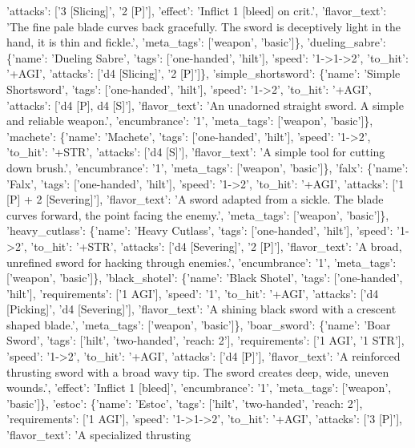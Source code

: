 \documentclass[
  letterpaper,
  DIV=11,
  numbers=noendperiod]{scrartcl}
\begin{document}
{'attacks': {[}'3 {[}Slicing{]}', '2 {[}P{]}'{]}, 'effect': 'Inflict 1
{[}bleed{]} on crit.', 'flavor\_text': 'The fine pale blade curves back
gracefully. The sword is deceptively light in the hand, it is thin and
fickle.', 'meta\_tags': {[}'weapon', 'basic'{]}\}, 'dueling\_sabre':
\{'name': 'Dueling Sabre', 'tags': {[}'one-handed', 'hilt'{]}, 'speed':
'1-\textgreater1-\textgreater2', 'to\_hit': '+AGI', 'attacks': {[}'d4
{[}Slicing{]}', '2 {[}P{]}'{]}\}, 'simple\_shortsword': \{'name':
'Simple Shortsword', 'tags': {[}'one-handed', 'hilt'{]}, 'speed':
'1-\textgreater2', 'to\_hit': '+AGI', 'attacks': {[}'d4 {[}P{]}, d4
{[}S{]}'{]}, 'flavor\_text': 'An unadorned straight sword. A simple and
reliable weapon.', 'encumbrance': '1', 'meta\_tags': {[}'weapon',
'basic'{]}\}, 'machete': \{'name': 'Machete', 'tags': {[}'one-handed',
'hilt'{]}, 'speed': '1-\textgreater2', 'to\_hit': '+STR', 'attacks':
{[}'d4 {[}S{]}'{]}, 'flavor\_text': 'A simple tool for cutting down
brush.', 'encumbrance': '1', 'meta\_tags': {[}'weapon', 'basic'{]}\},
'falx': \{'name': 'Falx', 'tags': {[}'one-handed', 'hilt'{]}, 'speed':
'1-\textgreater2', 'to\_hit': '+AGI', 'attacks': {[}'1 {[}P{]} + 2
{[}Severing{]}'{]}, 'flavor\_text': 'A sword adapted from a sickle. The
blade curves forward, the point facing the enemy.', 'meta\_tags':
{[}'weapon', 'basic'{]}\}, 'heavy\_cutlass': \{'name': 'Heavy Cutlass',
'tags': {[}'one-handed', 'hilt'{]}, 'speed': '1-\textgreater2',
'to\_hit': '+STR', 'attacks': {[}'d4 {[}Severing{]}', '2 {[}P{]}'{]},
'flavor\_text': 'A broad, unrefined sword for hacking through enemies.',
'encumbrance': '1', 'meta\_tags': {[}'weapon', 'basic'{]}\},
'black\_shotel': \{'name': 'Black Shotel', 'tags': {[}'one-handed',
'hilt'{]}, 'requirements': {[}'1 AGI'{]}, 'speed': '1', 'to\_hit':
'+AGI', 'attacks': {[}'d4 {[}Picking{]}', 'd4 {[}Severing{]}'{]},
'flavor\_text': 'A shining black sword with a crescent shaped blade.',
'meta\_tags': {[}'weapon', 'basic'{]}\}, 'boar\_sword': \{'name': 'Boar
Sword', 'tags': {[}'hilt', 'two-handed', 'reach: 2'{]}, 'requirements':
{[}'1 AGI', '1 STR'{]}, 'speed': '1-\textgreater2', 'to\_hit': '+AGI',
'attacks': {[}'d4 {[}P{]}'{]}, 'flavor\_text': 'A reinforced thrusting
sword with a broad wavy tip. The sword creates deep, wide, uneven
wounds.', 'effect': 'Inflict 1 {[}bleed{]}', 'encumbrance': '1',
'meta\_tags': {[}'weapon', 'basic'{]}\}, 'estoc': \{'name': 'Estoc',
'tags': {[}'hilt', 'two-handed', 'reach: 2'{]}, 'requirements': {[}'1
AGI'{]}, 'speed': '1-\textgreater1-\textgreater2', 'to\_hit': '+AGI',
'attacks': {[}'3 {[}P{]}'{]}, 'flavor\_text': 'A specialized thrusting
}
\end{document}
